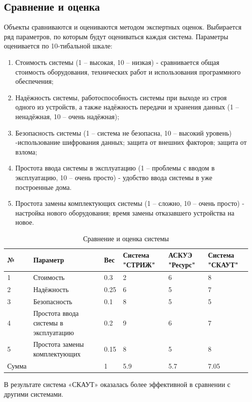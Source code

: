 \subsection{Сравнение и оценка}

Объекты сравниваются и оцениваются методом экспертных оценок. Выбирается ряд параметров, по которым будут оцениваться каждая система. Параметры оценивается по 10-тибальной шкале:
\begin{enumerate}
	\item Стоимость системы (1 – высокая, 10 – низкая) - сравнивается общая стоимость оборудования, технических работ и использования программного обеспечения;
	\item Надёжность системы, работоспособность системы при выходе из строя одного из устройств, а также надёжность передачи и хранения данных (1 – ненадёжная, 10 – очень надёжная);
	\item Безопасность системы (1 – система не безопасна, 10 – высокий уровень) -использование шифрования данных; защита от внешних факторов; защита от взлома; 
	\item Простота ввода системы в эксплуатацию (1 – проблемы с вводом в эксплуатацию, 10 – очень просто) - удобство ввода системы в уже построенные дома. 
	\item Простота замены комплектующих системы (1 – сложно, 10 – очень просто) - настройка нового оборудования; время замены отказавшего устройства на новое.
\end{enumerate}

\begin{table}[H]
	\caption{Сравнение и оценка системы} \label{tab:tab3}
	\centering
	\begin{tabular}{|p{1.4cm}|p{3cm}|p{1cm}|p{3cm}|p{3cm}|p{3cm}|}
		\hline 
		№ & Параметр & Вес & Система "СТРИЖ" & АСКУЭ "Ресурс" & Система "СКАУТ" \\ 
		\hline 
		1 & Стоимость & 0.3 & 2 & 6 & 8 \\ 
		\hline 
		2 & Надёжность & 0.25 & 6 & 5 & 7 \\ 
		\hline 
		3 & Безопасность & 0.1 & 8 & 5 & 5 \\ 
		\hline 
		4 & Простота ввода системы в эксплуатацию   & 0.2 & 9 & 6 & 7 \\ 
		\hline 
		5 & Простота замены комплектующих & 0.15 & 8 & 5 & 8 \\ 
		\hline 
		Сумма & & 1 & 5.9 & 5.7 & 7.05 \\ 
		\hline 
	\end{tabular} 
\end{table}
В результате система «СКАУТ» оказалась более эффективной в сравнении с другими системами. 